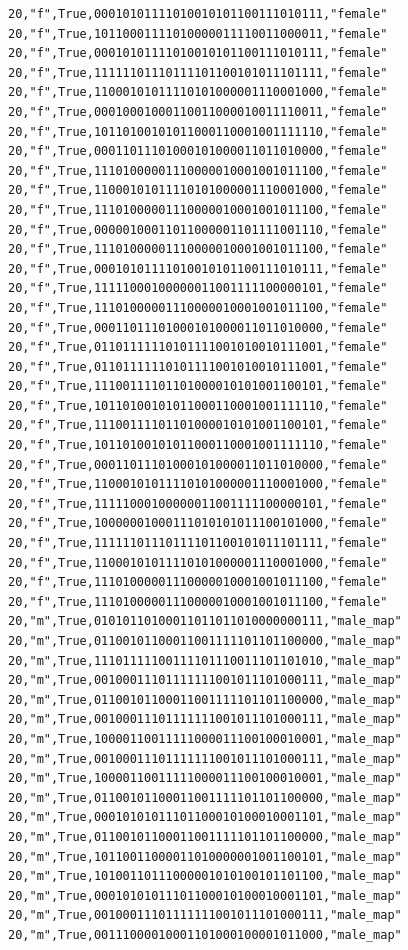 \documentclass[authoryearcitations]{UoYCSproject}
\begin{document}
\begin{framed}
\begin{verbatim}
20,"f",True,00010101111010010101100111010111,"female"
20,"f",True,10110001111010000011110011000011,"female"
20,"f",True,00010101111010010101100111010111,"female"
20,"f",True,11111101110111101100101011101111,"female"
20,"f",True,11000101011110101000001110001000,"female"
20,"f",True,00010001000110011000010011110011,"female"
20,"f",True,10110100101011000110001001111110,"female"
20,"f",True,00011011101000101000011011010000,"female"
20,"f",True,11101000001110000010001001011100,"female"
20,"f",True,11000101011110101000001110001000,"female"
20,"f",True,11101000001110000010001001011100,"female"
20,"f",True,00000100011011000001101111001110,"female"
20,"f",True,11101000001110000010001001011100,"female"
20,"f",True,00010101111010010101100111010111,"female"
20,"f",True,11111000100000011001111100000101,"female"
20,"f",True,11101000001110000010001001011100,"female"
20,"f",True,00011011101000101000011011010000,"female"
20,"f",True,01101111110101111001010010111001,"female"
20,"f",True,01101111110101111001010010111001,"female"
20,"f",True,11100111101101000010101001100101,"female"
20,"f",True,10110100101011000110001001111110,"female"
20,"f",True,11100111101101000010101001100101,"female"
20,"f",True,10110100101011000110001001111110,"female"
20,"f",True,00011011101000101000011011010000,"female"
20,"f",True,11000101011110101000001110001000,"female"
20,"f",True,11111000100000011001111100000101,"female"
20,"f",True,10000001000111010101011100101000,"female"
20,"f",True,11111101110111101100101011101111,"female"
20,"f",True,11000101011110101000001110001000,"female"
20,"f",True,11101000001110000010001001011100,"female"
20,"f",True,11101000001110000010001001011100,"female"
20,"m",True,01010110100011011011010000000111,"male_map"
20,"m",True,01100101100011001111101101100000,"male_map"
20,"m",True,11101111100111101110011101101010,"male_map"
20,"m",True,00100011101111111001011101000111,"male_map"
20,"m",True,01100101100011001111101101100000,"male_map"
20,"m",True,00100011101111111001011101000111,"male_map"
20,"m",True,10000110011111000011100100010001,"male_map"
20,"m",True,00100011101111111001011101000111,"male_map"
20,"m",True,10000110011111000011100100010001,"male_map"
20,"m",True,01100101100011001111101101100000,"male_map"
20,"m",True,00010101011101100010100010001101,"male_map"
20,"m",True,01100101100011001111101101100000,"male_map"
20,"m",True,10110011000011010000001001100101,"male_map"
20,"m",True,10100110111000001010100101101100,"male_map"
20,"m",True,00010101011101100010100010001101,"male_map"
20,"m",True,00100011101111111001011101000111,"male_map"
20,"m",True,00111000010001101000100001011000,"male_map"

\end{verbatim}
\end{framed}
\end{document}
